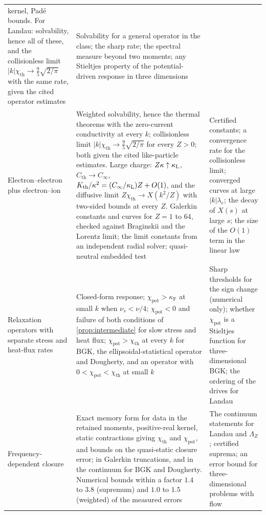 \documentclass[11pt]{article}
\newcommand{\F}{\kappa_{\mathrm F}}
\newcommand{\kap}{\kappa}
\newcommand{\thr}{\mathrm{th}}
\newcommand{\pot}{\mathrm{pot}}
\theoremstyle{definition}
\theoremstyle{remark}
\numberwithin{equation}{section}
\begin{document}
\begin{table}[ht]
\begin{tabularx}{\textwidth}{@{}>{\raggedright\arraybackslash}p{}
 >{\raggedright\arraybackslash}X>{\raggedright\arraybackslash}X@{}}
kernel, Pad\'e bounds. For Landau: solvability, hence
all of these, and the collisionless limit
$|k|\chi_\thr\to\tfrac95\sqrt{2/\pi}$ with the same rate, given the
cited operator estimates
 & Solvability for a general operator in the class; the sharp rate;
the spectral measure beyond two moments; any Stieltjes property of the
potential-driven response in three dimensions\\
\addlinespace
Electron--electron plus electron--ion
 & Weighted solvability, hence the thermal theorems with the zero-current
conductivity at every $k$; collisionless limit
$|k|\chi_\thr\to\tfrac95\sqrt{2/\pi}$ for every $Z>0$; both given the
cited like-particle estimates. Large charge: $Z\kap\uparrow\kap_{\rm L}$,
$C_\thr\to C_\infty$, $K_\thr/\kap^2=(C_\infty/\kap_{\rm L})Z+O(1)$, and
the diffusive limit $Z\chi_\thr\to X(k^2/Z)$ with two-sided bounds at
every $Z$. Galerkin constants and curves for $Z=1$ to $64$, checked
against Braginskii and the Lorentz limit; the limit constants from an
independent radial solver; quasi-neutral embedded test
 & Certified constants; a convergence rate for the collisionless limit;
converged curves at large $|k|\lambda_e$; the decay of $X(s)$ at large
$s$; the size of the $O(1)$ term in the linear law\\
\addlinespace
Relaxation operators with separate stress and heat-flux rates
 & Closed-form response; $\chi_\pot>\F$ at small $k$ when
$\nu_s<\nu/4$; $\chi_\pot<0$ and failure of both conditions of
\cref{prop:intermediate} for slow stress and heat flux; $\chi_\pot>\chi_\thr$
at every $k$ for BGK, the ellipsoidal-statistical operator and Dougherty,
and an operator with $0<\chi_\pot<\chi_\thr$ at small $k$
 & Sharp thresholds for the sign change (numerical only); whether
$\chi_\pot$ is a Stieltjes function for three-dimensional BGK; the
ordering of the drives for Landau\\
\addlinespace
Frequency-dependent closure
 & Exact memory form for data in the retained moments, positive-real
kernel, static contractions giving $\chi_\thr$ and $\chi_\pot$, and
bounds on the quasi-static closure error; in Galerkin truncations, and
in the continuum for BGK and Dougherty. Numerical bounds within a factor
$1.4$ to $3.8$ (supremum) and $1.0$ to $1.5$ (weighted) of the measured
errors
 & The continuum statements for Landau and $\Lambda_Z$; certified
suprema; an error bound for three-dimensional problems with flow\\
\bottomrule
\end{tabularx}
\end{table}
\end{document}
